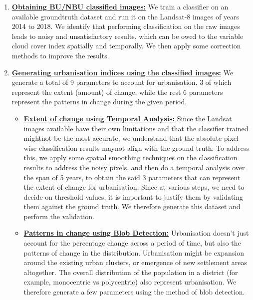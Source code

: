 \begin{enumerate}
	\item \hyperref[method:obtainimages]{{\bf Obtaining BU/NBU classified images:}} We train a classifier on an available groundtruth dataset and run it on the Landsat-8 images of years 2014 to 2018. We identify that performing classification on the raw images leads to noisy and unsatisfactory results, which can be owed to the variable cloud cover index spatially and temporally. We then apply some correction methods to improve the results.

	\item \hyperref[method:urbanisationindices]{{\bf Generating urbanisation indices using the classified images:}} We generate a total of 9 parameters to account for urbanisation, 3 of which represent the extent (amount) of change, while the rest 6 parameters represent the patterns in change during the given period.\\

		\begin{itemize}
			\item \hyperref[method:extentofchange]{{\bf Extent of change using Temporal Analysis:}} Since the Landsat images available have their own limitations and that the classifier trained mightnot be the most accurate, we  understand that the absolute pixel wise classification results maynot align with the ground truth. To address this, we apply some spatial smoothing techniques on the classification results to address the noisy pixels, and then do a temporal analysis over the span of 5 years, to obtain the said 3 parameters that can represent the extent of change for urbanisation. Since at various steps, we need to decide on threshold values, it is important to justify them by validating them against the ground truth. We therefore generate this dataset and perform the validation.

			\item \hyperref[method:patternofchange]{{\bf Patterns in change using Blob Detection:}} Urbanisation doesn't just account for the percentage change across a period of time, but also the patterns of change in the distribution. Urbanisation might be expansion around the existing urban clusters, or emergence of new settlement areas altogether. The overall distribution of the population in a district (for example, monocentric vs polycentric) also represent urbanisation. We therefore generate a few parameters using the method of blob detection.
		\end{itemize}
\end{enumerate}